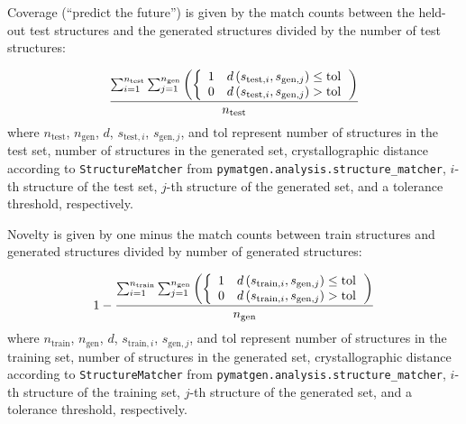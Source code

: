 Coverage (``predict the future'') is given by the match counts between the held-out test structures and the generated structures divided by the number of test structures:

\begin{equation} \label{eq:coverage}
	\frac{\sum _{i=1}^{n_{\text{test}}} \sum _{j=1}^{n_{\text{gen}}} \left(
		\left\{
		\begin{array}{cc}
			1 & d\left(s_{\text{test},i},s_{\text{gen},j}\right)\leq \text{tol} \\
			0 & d\left(s_{\text{test},i},s_{\text{gen},j}\right)>\text{tol} \\
		\end{array}
		\\
		\right.
		\right)}{n_{\text{test}}}
\end{equation}
where $n_{\text{test}}$, $n_{\text{gen}}$, $d$, $s_{\text{test},i}$, $s_{\text{gen},j}$, and $\text{tol}$ represent number of structures in the test set, number of structures in the generated set, crystallographic distance according to \texttt{StructureMatcher} from \texttt{pymatgen.analysis.structure\_matcher}, $i$-th structure of the test set, $j$-th structure of the generated set, and a tolerance threshold, respectively.

Novelty is given by one minus the match counts between train structures and generated structures divided by number of generated structures:

\begin{equation} \label{eq:novelty}
	1-\frac{\sum _{i=1}^{n_{\text{train}}} \sum _{j=1}^{n_{\text{gen}}} \left(
		\left\{
		\begin{array}{cc}
			1 & d\left(s_{\text{train},i},s_{\text{gen},j}\right)\leq \text{tol} \\
			0 & d\left(s_{\text{train},i},s_{\text{gen},j}\right)>\text{tol} \\
		\end{array}
		\\
		\right.
		\right)}{n_{\text{gen}}}
\end{equation}
where $n_{\text{train}}$, $n_{\text{gen}}$, $d$, $s_{\text{train},i}$, $s_{\text{gen},j}$, and $\text{tol}$ represent number of structures in the training set, number of structures in the generated set, crystallographic distance according to \texttt{StructureMatcher} from \texttt{pymatgen.analysis.structure\_matcher}, $i$-th structure of the training set, $j$-th structure of the generated set, and a tolerance threshold, respectively.

